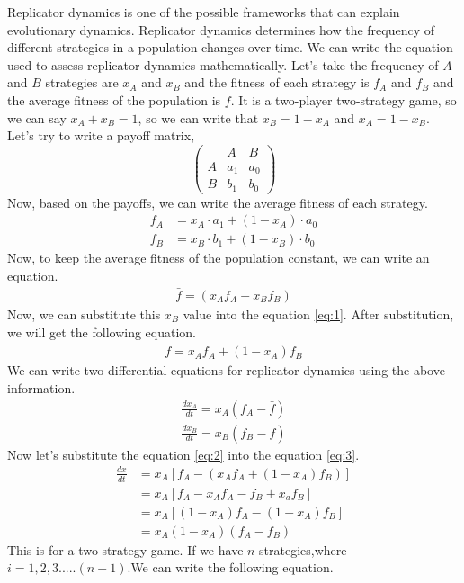 \documentclass{article}
\begin{document}
Replicator dynamics is one of the possible frameworks that can explain evolutionary dynamics. Replicator dynamics determines how the frequency of different strategies in a population changes over time. We can write the equation used to assess replicator dynamics mathematically. Let's take the frequency of $A$ and $B$ strategies are $x_A$ and $x_B$ and the fitness of each strategy is $f_A$ and $f_B$ and the average fitness of the population is $\bar{f}$. It is a two-player two-strategy game, so we can say $ x_A+x_B=1 $, so we can write that $x_B=1-x_A$ and $x_A=1-x_B$. Let's try to write a payoff matrix,\\
\[
\begin{pmatrix}
& A & B \\
  A & a_1 & a_0 \\
  B & b_1 & b_0
\end{pmatrix}
\]
Now, based on the payoffs, we can write the average fitness of each strategy.
\begin{align}
f_A &=x_A\cdot a_1 + (1-x_A)\cdot a_0 \nonumber\\
f_B &=x_B\cdot b_1 + (1-x_B)\cdot b_0 \nonumber
\end{align} 
Now, to keep the average fitness of the population constant, we can write an equation.
\begin{align}
\bar{f}= (x_Af_A+x_Bf_B)\label{eq:1}
\end{align}
Now, we can substitute this $x_B$ value into the equation \eqref{eq:1}. After substitution, we will get the following equation.
\begin{align}
\bar{f}={x_Af_A+ (1-x_A)f_B}\label{eq:2}
\end{align}
We can write two differential equations for replicator dynamics using the above information.
\begin{align}
\frac{dx_A}{dt} = x_A(f_A - \bar{f}) \nonumber \\
\frac{dx_B}{dt} = x_B(f_B - \bar{f}) \label{eq:3}
\end{align}
Now let's substitute the equation \eqref{eq:2} into the equation \eqref{eq:3}.
\begin{align}
\frac{dx}{dt} &=x_A[f_A-(x_Af_A+(1-x_A)f_B)] \nonumber\\
          &=x_A[f_A-x_Af_A-f_B+x_af_B] \nonumber\\
          &=x_A[(1-x_A)f_A-(1-x_A)f_B] \nonumber\\
          &=x_A(1-x_A)(f_A-f_B) \label{eq:4}
\end{align}
This is for a two-strategy game. If we have $n$ strategies,where $i=1,2,3.....(n-1)$.We can write the following equation.
\end{document}
